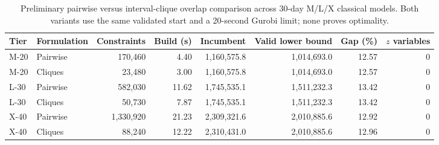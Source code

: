 \begin{table}[htbp]
\centering\small
\caption{Preliminary pairwise versus interval-clique overlap comparison across 30-day M/L/X classical models. Both variants use the same validated start and a 20-second Gurobi limit; none proves optimality.}
\label{tab:strength_overlap_m20}
\begin{tabular}{llrrrrrr}
\toprule
Tier & Formulation & Constraints & Build (s) & Incumbent & Valid lower bound & Gap (\%) & $z$ variables \\
\midrule
M-20 & Pairwise & 170,460 & 4.40 & 1,160,575.8 & 1,014,693.0 & 12.57 & 0 \\
M-20 & Cliques & 23,480 & 3.00 & 1,160,575.8 & 1,014,693.0 & 12.57 & 0 \\
L-30 & Pairwise & 582,030 & 11.62 & 1,745,535.1 & 1,511,232.3 & 13.42 & 0 \\
L-30 & Cliques & 50,730 & 7.87 & 1,745,535.1 & 1,511,232.3 & 13.42 & 0 \\
X-40 & Pairwise & 1,330,920 & 21.23 & 2,309,321.6 & 2,010,885.6 & 12.92 & 0 \\
X-40 & Cliques & 88,240 & 12.22 & 2,310,431.0 & 2,010,885.6 & 12.96 & 0 \\
\bottomrule
\end{tabular}
\end{table}
